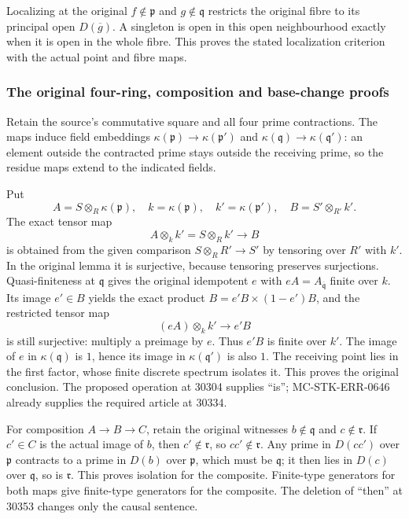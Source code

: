 Localizing at the original \(f\notin\mathfrak p\) and \(g\notin\mathfrak q\) restricts the original fibre to its principal open \(D(\overline g)\). A singleton is open in this open neighbourhood exactly when it is open in the whole fibre. This proves the stated localization criterion with the actual point and fibre maps.

\subsubsection{The original four-ring, composition and base-change proofs}\label{algebra-proof-031-the-original-four-ring-composition-and-base-change-proofs}

Retain the source's commutative square and all four prime contractions. The maps induce field embeddings \(\kappa(\mathfrak p)\to\kappa(\mathfrak p')\) and \(\kappa(\mathfrak q)\to\kappa(\mathfrak q')\): an element outside the contracted prime stays outside the receiving prime, so the residue maps extend to the indicated fields.

Put \[
 A=S\otimes_R\kappa(\mathfrak p),\quad
 k=\kappa(\mathfrak p),\quad k'=\kappa(\mathfrak p'),\quad
 B=S'\otimes_{R'}k'.
\] The exact tensor map \[
 A\otimes_k k'=S\otimes_R k'\longrightarrow B
\] is obtained from the given comparison \(S\otimes_RR'\to S'\) by tensoring over \(R'\) with \(k'\). In the original lemma it is surjective, because tensoring preserves surjections. Quasi-finiteness at \(\mathfrak q\) gives the original idempotent \(e\) with \(eA=A_{\overline{\mathfrak q}}\) finite over \(k\). Its image \(e'\in B\) yields the exact product \(B=e'B\times(1-e')B\), and the restricted tensor map \[
 (eA)\otimes_k k'\longrightarrow e'B
\] is still surjective: multiply a preimage by \(e\). Thus \(e'B\) is finite over \(k'\). The image of \(e\) in \(\kappa(\mathfrak q)\) is \(1\), hence its image in \(\kappa(\mathfrak q')\) is also \(1\). The receiving point lies in the first factor, whose finite discrete spectrum isolates it. This proves the original conclusion. The proposed operation at 30304 supplies ``is''; MC-STK-ERR-0646 already supplies the required article at 30334.

For composition \(A\to B\to C\), retain the original witnesses \(b\notin\mathfrak q\) and \(c\notin\mathfrak r\). If \(c'\in C\) is the actual image of \(b\), then \(c'\notin\mathfrak r\), so \(cc'\notin\mathfrak r\). Any prime in \(D(cc')\) over \(\mathfrak p\) contracts to a prime in \(D(b)\) over \(\mathfrak p\), which must be \(\mathfrak q\); it then lies in \(D(c)\) over \(\mathfrak q\), so is \(\mathfrak r\). This proves isolation for the composite. Finite-type generators for both maps give finite-type generators for the composite. The deletion of ``then'' at 30353 changes only the causal sentence.


